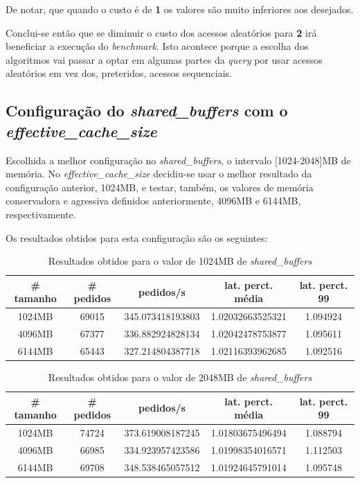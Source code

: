 De notar, que quando o custo é de \textbf{1} os valores são muito inferiores aos desejados.

Conclui-se então que se diminuir o custo dos acessos aleatórios para \textbf{2} irá beneficiar a execução do \textit{benchmark}. Isto acontece porque a escolha dos algoritmos vai passar a optar em algumas partes da \textit{query} por usar acessos aleatórios em vez dos, preteridos, acessos sequenciais.

\newpage

\subsection{Configuração do \textit{shared\_buffers} com o \textit{effective\_cache\_size}}

Escolhida a melhor configuração no \textit{shared\_buffers}, o intervalo [1024-2048]MB de memória. No \textit{effective\_cache\_size} decidiu-se usar o melhor resultado da configuração anterior, 1024MB, e testar, também, os valores de memória conservadora e agressiva definidos anteriormente, 4096MB e 6144MB, respectivamente.

Os resultados obtidos para esta configuração são os seguintes:

\begin{table}[!h]
\center
\small
\begin{tabular}{|c|c|c|c|c|}
\hline
\textbf{\# tamanho} & \textbf{\# pedidos} & \textbf{pedidos/s} & \textbf{lat. perct. média} & \textbf{lat. perct. 99}  \\ \hline
1024MB & 69015 & 345.073418193803 & 1.02032663525321 & 1.094924  \\ \hline
4096MB & 67377 & 336.882924828134 & 1.02042478753877 & 1.095611  \\ \hline
6144MB & 65443 & 327.214804387718 & 1.02116393962685 & 1.092516  \\ \hline
\end{tabular}
\caption{Resultados obtidos para o valor de 1024MB de \textit{shared\_buffers}}
\end{table}

\begin{table}[!h]
\center
\small
\begin{tabular}{|c|c|c|c|c|}
\hline
\textbf{\# tamanho} & \textbf{\# pedidos} & \textbf{pedidos/s} & \textbf{lat. perct. média} & \textbf{lat. perct. 99}  \\ \hline
1024MB & 74724 & 373.619008187245 & 1.01803675496494 & 1.088794  \\ \hline
4096MB & 66985 & 334.923957423586 & 1.01998354016571 & 1.112503  \\ \hline
6144MB & 69708 & 348.538465057512 & 1.01924645791014 & 1.095748  \\ \hline
\end{tabular}
\caption{Resultados obtidos para o valor de 2048MB de \textit{shared\_buffers}}
\end{table}

